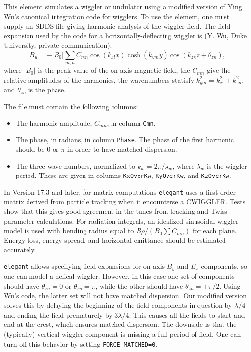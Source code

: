 This element simulates a wiggler or undulator using a modified version of Ying Wu's
canonical integration code for wigglers.  To use the element, one must
supply an SDDS file giving harmonic analysis of the wiggler field.
The field expansion used by the code for a horizontally-deflecting
wiggler is (Y. Wu, Duke University, private communication).
\begin{equation}
B_y = -\left|B_0\right| \sum_{m,n} C_{mn}\cos(k_{xl} x) \cosh (k_{ym} y)
\cos(k_{zn} z + \theta_{zn}),
\end{equation}
where $\left|B_0\right|$ is the peak value of the on-axis magnetic field,
the $C_{mn}$ give the relative amplitudes of the harmonics, the wavenumbers
statisfy $k^2_{ym} = k^2_{xl} + k^2_{zn}$, and $\theta_{zn}$ is the phase.

The file must contain the following columns:
\begin{itemize}
\item The harmonic amplitude, $C_{mn}$, in column {\tt Cmn}.
\item The phase, in radians, in column {\tt Phase}.  The phase of the first
harmonic should be 0 or $\pi$ in order to have matched dispersion.
\item The three wave numbers, normalized to $k_w = 2\pi/\lambda_w$, where
 $\lambda_w$ is the wiggler period.  These are given in columns 
 {\tt KxOverKw}, {\tt KyOverKw}, and {\tt KzOverKw}.
\end{itemize}

In Version 17.3 and later, for matrix computations {\tt elegant} uses
a first-order matrix derived from particle tracking when it
encounterse a CWIGGLER.  Tests show that this gives good agreement in
the tunes from tracking and Twiss parameter calculations.  For
radiation integrals, an idealized sinusoidal wiggler model is used
with bending radius equal to $B\rho/(B_0 \sum C_{mn})$ for each plane.
Energy loss, energy spread, and horizontal emittance should be estimated
accurately.

{\tt elegant} allows specifying field expansions for on-axis $B_y$ and
$B_x$ components, so one can model a helical wiggler.  However, in this
case one set of components should have $\theta_{zn} = 0$ or $\theta_{zn}=\pi$,
while the other should have $\theta_{zn} = \pm \pi/2$.
Using Wu's code, the latter set will not have matched dispersion.  Our
modified version solves this by delaying the beginning of the field
components in question by $\lambda/4$ and ending the field prematurely
by $3\lambda/4$.  This causes all the fields to start and end at the
crest, which ensures matched dispersion.  The downside is that the
(typically) vertical wiggler component is missing a full period of
field.  One can turn off this behavior by setting \verb|FORCE_MATCHED=0|.

